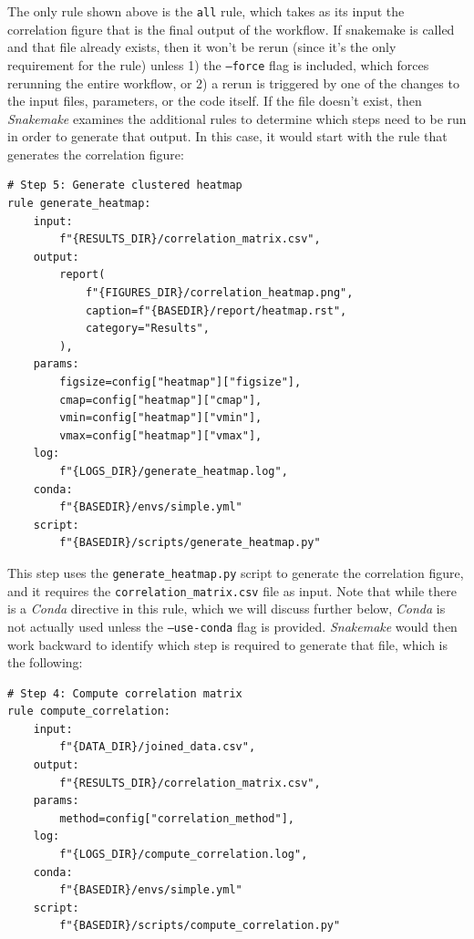 The only rule shown above is the \texttt{all} rule, which takes as its input the correlation figure that is the final output of the workflow.  If snakemake is called and that file already exists, then it won't be rerun (since it's the only requirement for the rule) unless 1) the \texttt{--force} flag is included, which forces rerunning the entire workflow, or 2) a rerun is triggered by one of the changes to the input files, parameters, or the code itself.  If the file doesn't exist, then \textit{Snakemake} examines the additional rules to determine which steps need to be run in order to generate that output.  In this case, it would start with the rule that generates the correlation figure:

\begin{lstlisting}[style=Python]
# Step 5: Generate clustered heatmap
rule generate_heatmap:
    input:
        f"{RESULTS_DIR}/correlation_matrix.csv",
    output:
        report(
            f"{FIGURES_DIR}/correlation_heatmap.png",
            caption=f"{BASEDIR}/report/heatmap.rst",
            category="Results",
        ),
    params:
        figsize=config["heatmap"]["figsize"],
        cmap=config["heatmap"]["cmap"],
        vmin=config["heatmap"]["vmin"],
        vmax=config["heatmap"]["vmax"],
    log:
        f"{LOGS_DIR}/generate_heatmap.log",
    conda:
        f"{BASEDIR}/envs/simple.yml"
    script:
        f"{BASEDIR}/scripts/generate_heatmap.py"
\end{lstlisting}

This step uses the \texttt{generate\_heatmap.py} script to generate the correlation figure, and it requires the \texttt{correlation\_matrix.csv} file as input.  Note that while there is a \textit{Conda} directive in this rule, which we will discuss further below, \textit{Conda} is not actually used unless the \texttt{--use-conda} flag is provided.  \textit{Snakemake} would then work backward to identify which step is required to generate that file, which is the following:

\begin{lstlisting}[style=Python]
# Step 4: Compute correlation matrix
rule compute_correlation:
    input:
        f"{DATA_DIR}/joined_data.csv",
    output:
        f"{RESULTS_DIR}/correlation_matrix.csv",
    params:
        method=config["correlation_method"],
    log:
        f"{LOGS_DIR}/compute_correlation.log",
    conda:
        f"{BASEDIR}/envs/simple.yml"
    script:
        f"{BASEDIR}/scripts/compute_correlation.py"
\end{lstlisting}

